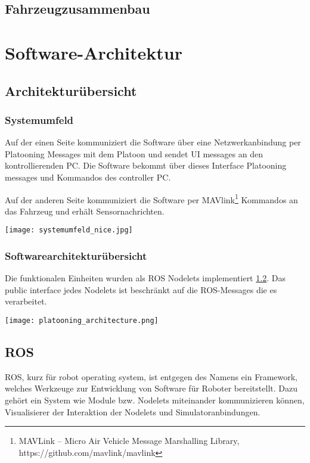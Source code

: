 \documentclass[a4paper, 12pt, titlepage]{scrartcl}
\begin{document}
		\subsection{Fahrzeugzusammenbau}
		\label{fahrzeugzusammenbau}
	\newpage
	\section{Software-Architektur}
	\label{sw_architektur}
		\subsection{Architekturübersicht}
		\label{sw_uebersicht}
		\subsubsection*{Systemumfeld}

		Auf der einen Seite kommuniziert die Software über eine Netzwerkanbindung per Platooning Messages mit dem Platoon und sendet UI messages an den kontrollierenden PC. Die Software bekommt über dieses Interface Platooning messages und Kommandos des controller PC.

		Auf der anderen Seite kommuniziert die Software per MAVlink\footnote{MAVLink -- Micro Air Vehicle Message Marshalling Library, https://github.com/mavlink/mavlink} Kommandos an das Fahrzeug und erhält Sensornachrichten.

 		\texttt{[image: systemumfeld\_nice.jpg]}

 		\subsubsection*{Softwarearchitekturübersicht}

 		Die funktionalen Einheiten wurden als ROS Nodelets implementiert \ref{ros}. Das public interface jedes Nodelets ist beschränkt auf die ROS-Messages die es verarbeitet.

		\newpage
 		\texttt{[image: platooning\_architecture.png]}

		\subsection{ROS}
		\label{ros}
		ROS, kurz für robot operating system, ist entgegen des Namens ein Framework, welches Werkzeuge zur Entwicklung von Software für Roboter bereitstellt. Dazu gehört ein System wie Module bzw. Nodelets miteinander kommunizieren können, Visualisierer der Interaktion der Nodelets und Simulatoranbindungen.\\
\end{document}
